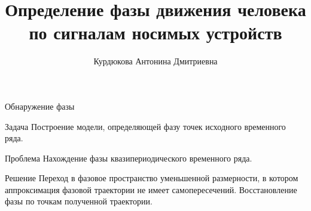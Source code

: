 \documentclass{beamer}
\title[\hbox to 56mm{Определение фазы}]{Определение фазы движения человека\\по сигналам носимых устройств}
\author[А.\,Д. Курдюкова]{Курдюкова Антонина Дмитриевна}
\institute{Московский физико-технический институт}
\date{\footnotesize
\par\smallskip\emph{Курс:} Автоматизация научных исследований\par (практика, В.\,В.~Стрижов)/Группа 874
\par\smallskip\emph{Эксперт:} В.\,В.~Стрижов
\par\smallskip\emph{Консультанты:} Г.\,В.~Кормаков, Д.\,М.~Тихонов
\par\bigskip\small 2021}
\begin{document}
\begin{frame}
\thispagestyle{empty}
\maketitle
\end{frame}
\begin{frame}{Обнаружение фазы}

\begin{alertblock}{Задача}
Построение модели, определяющей фазу точек исходного временного ряда.
\end{alertblock}

\begin{alertblock}{Проблема}
Нахождение фазы квазипериодического временного ряда.
\end{alertblock}

\begin{alertblock}{Решение}
Переход в фазовое пространство уменьшенной размерности, в котором аппроксимация фазовой траектории не имеет самопересечений. Восстановление фазы по точкам полученной траектории. 
\end{alertblock}

\end{frame}
\end{document}

